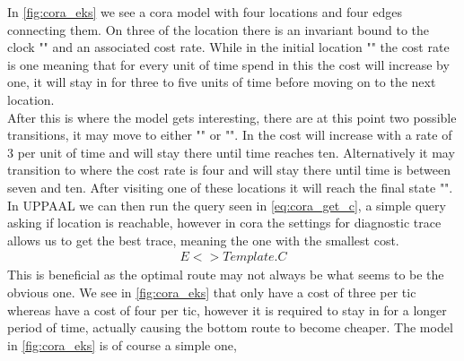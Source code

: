 In \cref{fig:cora_eks} we see a \gls{cora} model with four locations and four edges connecting them. On three of the location there is an invariant bound to the clock "" and an associated cost rate. While in the initial location "" the cost rate is one meaning that for every unit of time spend in this  the cost will increase by one, it will stay in  for three to five units of time before moving on to the next location.\\
After this is where the model gets interesting, there are at this point two possible transitions, it may move to either "" or "". In  the cost will increase with a rate of 3 per unit of time and will stay there until time reaches ten. Alternatively it may transition to  where the cost rate is four and will stay there until time is between seven and ten. After visiting one of these locations it will reach the final state "". \\
In UPPAAL we can then run the query seen in \cref{eq:cora_get_c}, a simple query asking if location  is reachable, however in \gls{cora} the settings for diagnostic trace allows us to get the best trace, meaning the one with the smallest cost.
\begin{align}
E<> Template.C
\label{eq:cora_get_c}
\end{align}
This is beneficial as the optimal route may not always be what seems to be the obvious one. We see in \cref{fig:cora_eks} that  only have a cost of three per tic whereas  have a cost of four per tic, however it is required to stay in  for a longer period of time, actually causing the bottom route to become cheaper.
The model in \cref{fig:cora_eks} is of course a simple one,







